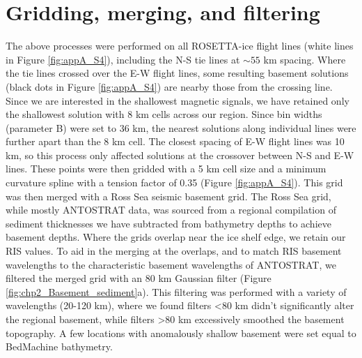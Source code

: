 \section{Gridding, merging, and filtering} \label{appA:text_S5}
The above processes were performed on all ROSETTA-ice flight lines (white lines in Figure \ref{fig:appA_S4}), including the N-S tie lines at $\sim55$ km spacing. Where the tie lines crossed over  the E-W flight lines, some resulting basement solutions (black dots in Figure \ref{fig:appA_S4}) are nearby those from the crossing line. Since we are interested in the shallowest magnetic signals, we have retained only the shallowest solution with 8 km cells across our region. Since bin widths (parameter B) were set to 36 km, the nearest solutions along individual lines were further apart than the 8 km cell. The closest spacing of E-W flight lines was 10 km, so this process only affected solutions at the crossover between N-S and E-W lines. These points were then gridded with a 5 km cell size and a minimum curvature spline with a tension factor of 0.35 \cite{smithgridding1990} (Figure \ref{fig:appA_S4}). This grid was then merged with a Ross Sea seismic basement grid. The Ross Sea grid, while mostly ANTOSTRAT data, was sourced from a regional compilation of sediment thicknesses \citep{lindequepreglacial2016, wilsonwest2009} we have subtracted from bathymetry depths \citep{morlighemdeep2020} to achieve basement depths. Where the grids overlap near the ice shelf edge, we retain our RIS values. To aid in the merging at the overlaps, and to match RIS basement wavelengths to the characteristic basement wavelengths of ANTOSTRAT, we filtered the merged grid with an 80 km Gaussian filter (Figure \ref{fig:chp2_Basement_sediment}a). This filtering was performed with a variety of wavelengths (20-120 km), where we found filters \textless 80 km didn’t significantly alter the regional basement, while filters \textgreater 80 km excessively smoothed the basement topography. A few locations with anomalously shallow basement were set equal to BedMachine bathymetry.

